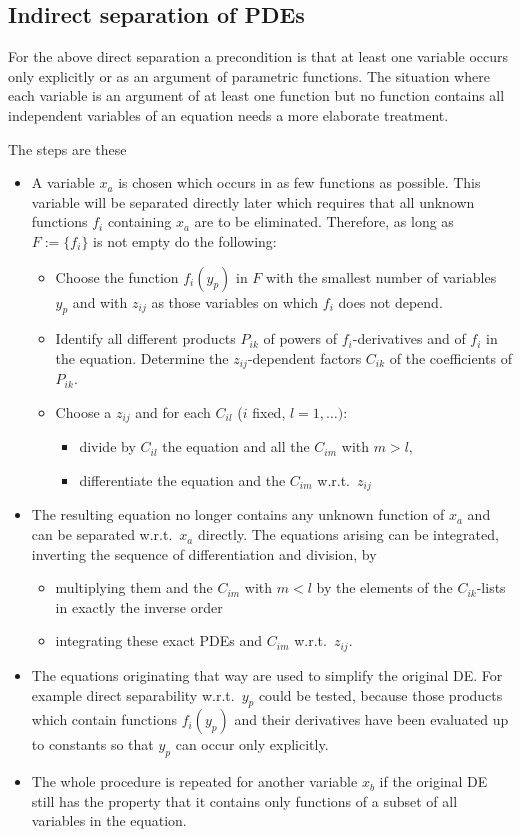\subsection{Indirect separation of PDEs}
For the above direct separation a precondition is that at least one
variable occurs only explicitly or as an argument of parametric
functions.  The situation where each variable is an argument of at least
one function but no function contains all independent variables of an
equation needs a more elaborate treatment.

The steps are these 
\begin{itemize}
 \item A variable $x_a$ is chosen which occurs in as few functions as possible.
 This variable will be separated directly later which
 requires that all unknown functions $f_i$ containing $x_a$ are to be
 eliminated. Therefore, as long as $F:=\{f_i\}$ is not empty do the following:
 \begin{itemize}
  \item Choose the function $f_i(y_p)$ in $F$ with the smallest number of
  variables $y_p$ and with $z_{ij}$ as those variables on which $f_i$ does 
  not depend.
  \item Identify all different products $P_{ik}$ of powers of 
  $f_i$-derivatives and of $f_i$ in the equation. 
  Determine the $z_{ij}$-dependent factors $C_{ik}$ of the coefficients 
  of $P_{ik}$.
  \item Choose a $z_{ij}$ and for each $C_{il}$ ($i$ fixed, $l=1,\ldots)$:
  \begin{itemize}
   \item divide by $C_{il}$ the equation and all the $C_{im}$ with $m>l,$
   \item differentiate the equation and the $C_{im}$ w.r.t.\ $z_{ij}$
  \end{itemize}
 \end{itemize}
 \item The resulting equation no longer contains any unknown function of $x_a$
 and can be separated w.r.t.\ $x_a$ directly. The
 equations arising can be integrated, inverting the sequence of differentiation
 and division, by
 \begin{itemize}
  \item multiplying them and the $C_{im}$ with $m<l$ by the elements
  of the $C_{ik}$-lists in exactly the inverse order 
  \item integrating these exact PDEs and $C_{im}$ w.r.t.\ $z_{ij}$.
 \end{itemize}
 \item The equations originating that way are used to simplify the original 
 DE\@. For example direct separability w.r.t.\ $y_p$ could be tested, because
 those products which contain functions $f_i(y_p)$ and their derivatives 
 have been evaluated up to constants so that $y_p$ can occur only explicitly.
 \item The whole procedure is repeated for another variable $x_b$ if the
 original DE still has the property that it contains only functions of
 a subset of all variables in the equation.
\end{itemize}
